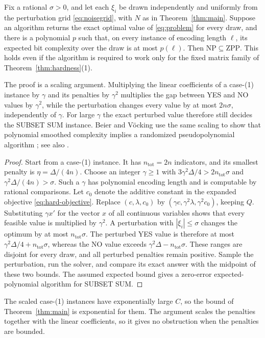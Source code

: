 \begin{corollary}\label{cor:magnitude}
Fix a rational $\sigma>0$, and let each $\xi_i$ be drawn independently
and uniformly from the perturbation grid \eqref{eq:noisegrid}, with $N$
as in Theorem~\ref{thm:main}. Suppose an algorithm returns the exact
optimal value of \eqref{eq:problem} for every draw, and there is a
polynomial $p$ such that, on every instance of encoding length $\ell$,
its expected bit complexity over the draw is at most $p(\ell)$. Then
$\mathrm{NP}\subseteq\mathrm{ZPP}$. This holds even if the algorithm is
required to work only for the fixed matrix family of
Theorem~\ref{thm:hardness}(1).
\end{corollary}
The proof is a scaling argument. Multiplying the linear coefficients of
a case-(1) instance by $\gamma$ and its penalties by $\gamma^2$
multiplies the gap between YES and NO values by $\gamma^2$,
while the perturbation changes every value by at most $2n\sigma$,
independently of $\gamma$. For large $\gamma$ the exact perturbed value
therefore still decides the SUBSET SUM instance. Beier and V\"ocking use
the same scaling to show that polynomial smoothed complexity implies a
randomized pseudopolynomial algorithm
\cite[conference version, Theorem~3]{BeierVocking}; see also
\cite[Theorem~6.2]{RoglinTeng}.
\begin{proof}
Start from a case-(1) instance. It has $n_{\mathrm{tot}}=2n$ indicators,
and its smallest penalty is $\eta=\Delta/(4n)$. Choose an integer
$\gamma\ge1$ with $3\gamma^2\Delta/4>2n_{\mathrm{tot}}\sigma$ and
$\gamma^2\Delta/(4n)>\sigma$. Such a $\gamma$ has polynomial encoding
length and is computable by rational comparisons.
Let $c_0$ denote the additive constant in the expanded objective
\eqref{eq:hard-objective}. Replace $(c,\lambda,c_0)$ by
$(\gamma c,\gamma^2\lambda,\gamma^2c_0)$, keeping $Q$.
Substituting $\gamma x'$ for the vector $x$ of all continuous variables
shows that every feasible value is multiplied by $\gamma^2$. A
perturbation with $|\xi_i|\le\sigma$ changes the optimum by at most
$n_{\mathrm{tot}}\sigma$. The perturbed YES value is therefore at most
$\gamma^2\Delta/4+n_{\mathrm{tot}}\sigma$, whereas the NO value exceeds
$\gamma^2\Delta-n_{\mathrm{tot}}\sigma$.
These ranges are disjoint for every draw, and all perturbed penalties
remain positive. Sample the perturbation, run the solver, and compare
its exact answer with the midpoint of these two bounds. The assumed
expected bound gives a zero-error expected-polynomial algorithm for
SUBSET SUM.
\end{proof}
The scaled case-(1) instances have exponentially large $C$, so the
bound of Theorem~\ref{thm:main} is exponential for them. The argument
scales the penalties together with the linear coefficients, so it gives
no obstruction when the penalties are bounded.

